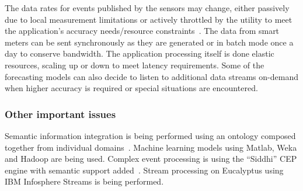 
The data rates for events published by the sensors may change, either passively due to local measurement limitations or actively throttled by the utility to meet the application's accuracy needs/resource constraints~\cite{Simmhan:sciencecloud:2011}. The data from smart meters can be sent synchronously as they are generated or in batch mode once a day to conserve bandwidth. The application processing itself is done elastic resources, scaling up or down to meet latency requirements. Some of the forecasting models can also decide to listen to additional data streams on-demand when higher accuracy is required or special situations are encountered.

 \subsubsection*{Other important issues}



Semantic
information integration is being performed using an ontology composed together from individual
domains~\cite{Zhou:itng:2012}. Machine learning models using Matlab, Weka and Hadoop are being used. Complex event processing is using the ``Siddhi'' CEP engine with semantic support added~\cite{siddhi}. Stream processing on Eucalyptus using IBM Infosphere Streams is being performed.





